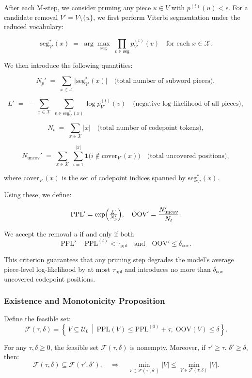 After each M‐step, we consider pruning any piece \(u\in V\) with \(p^{(t)}(u)<\epsilon\).  For a candidate removal \(V' = V \setminus \{u\}\), we first perform Viterbi segmentation under the reduced vocabulary:

\[
\mathrm{seg}^{*}_{V'}(x) \;=\;\arg\max_{\mathrm{seg}} \;\prod_{v\in\mathrm{seg}} p^{(t)}_{V'}(v)
\quad\text{for each }x\in\mathcal X.
\]

We then introduce the following quantities:

\[
N_{p}' \;=\;\sum_{x\in\mathcal X} \bigl|\mathrm{seg}^{*}_{V'}(x)\bigr|
\quad\text{(total number of subword pieces)},
\]

\[
L' \;=\; -\,\sum_{x\in\mathcal X}\;\sum_{v\in\mathrm{seg}^{*}_{V'}(x)}\log p^{(t)}_{V'}(v)
\quad\text{(negative log‐likelihood of all pieces)},
\]

\[
N_{t} \;=\;\sum_{x\in\mathcal X} |x|
\quad\text{(total number of codepoint tokens)},
\]

\[
N_{\mathrm{uncov}}' 
\;=\; \sum_{x\in\mathcal X}\;\sum_{i=1}^{|x|}
\mathbf1\bigl(i\not\in \mathrm{cover}_{V'}(x)\bigr)
\quad\text{(total uncovered positions)},
\]

where \(\mathrm{cover}_{V'}(x)\) is the set of codepoint indices spanned by \(\mathrm{seg}^{*}_{V'}(x)\).

Using these, we define:

\[
\mathrm{PPL}' 
= \exp\Bigl(\tfrac{L'}{N_{p}'}\Bigr),
\quad
\mathrm{OOV}' 
= \frac{N_{\mathrm{uncov}}'}{N_{t}}.
\]

We accept the removal \(u\) if and only if both
\[
\mathrm{PPL}' - \mathrm{PPL}^{(t)} < \tau_{\mathrm{ppl}}
\quad\text{and}\quad
\mathrm{OOV}' \le \delta_{\mathrm{oov}}.
\]

This criterion guarantees that any pruning step degrades the model’s average piece‐level log‐likelihood by at most \(\tau_{\mathrm{ppl}}\) and introduces no more than \(\delta_{\mathrm{oov}}\) uncovered codepoint positions.

\subsubsection{Existence and Monotonicity Proposition}

Define the feasible set:
\[
\mathcal F(\tau,\delta)
= \left\{\,V\subseteq\mathcal U_{0}\,\middle|\,
\mathrm{PPL}(V)\le \mathrm{PPL}^{(0)}+\tau,\;
\mathrm{OOV}(V)\le \delta
\right\}.
\]

\begin{proposition}
	For any \(\tau,\delta \ge 0\), the feasible set \(\mathcal F(\tau,\delta)\) is nonempty. Moreover, if \(\tau' \ge \tau\), \(\delta' \ge \delta\), then:
	\[
	\mathcal F(\tau,\delta) \subseteq \mathcal F(\tau',\delta'),
	\quad
	\Rightarrow
	\quad
	\min_{V\in\mathcal F(\tau',\delta')}|V| \le \min_{V\in\mathcal F(\tau,\delta)}|V|.
	\]
\end{proposition}

